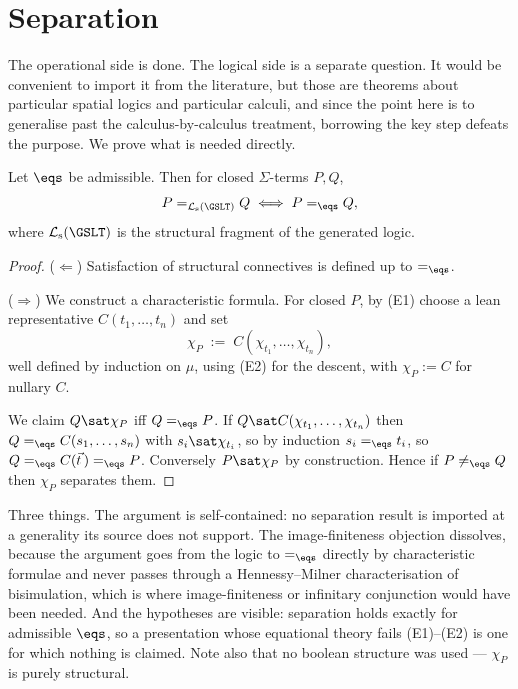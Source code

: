 \section{Separation}
\label{ox:sec:sep}

The operational side is done. The logical side is a separate question. It would be
convenient to import it from the literature, but those are theorems about
particular spatial logics and particular calculi, and since the point here is to
generalise past the calculus-by-calculus treatment, borrowing the key step defeats
the purpose. We prove what is needed directly.

\begin{theorem}
\label{ox:thm:sep}
Let $\eqs$ be admissible. Then for closed $\Sigma$-terms $P,Q$,
\[
  P =_{\mathcal{L}_{\mathrm{s}}(\GSLT)} Q \iff P =_{\eqs} Q ,
\]
where $\mathcal{L}_{\mathrm{s}}(\GSLT)$ is the structural fragment of the
generated logic.
\end{theorem}

\begin{proof}
($\Leftarrow$) Satisfaction of structural connectives is defined up to $=_{\eqs}$.

($\Rightarrow$) We construct a characteristic formula. For closed $P$, by (E1)
choose a lean representative $C(t_1,\dots,t_n)$ and set
\[
  \chi_P \;:=\; C(\chi_{t_1},\dots,\chi_{t_n}),
\]
well defined by induction on $\mu$, using (E2) for the descent, with
$\chi_P := C$ for nullary $C$.

We claim $Q \sat \chi_P$ iff $Q =_{\eqs} P$. If
$Q \sat C(\chi_{t_1},\dots,\chi_{t_n})$ then $Q =_{\eqs} C(s_1,\dots,s_n)$ with
$s_i \sat \chi_{t_i}$, so by induction $s_i =_{\eqs} t_i$, so
$Q =_{\eqs} C(\vec t\,) =_{\eqs} P$. Conversely $P \sat \chi_P$ by construction.
Hence if $P \neq_{\eqs} Q$ then $\chi_P$ separates them.
\end{proof}

\begin{remark}
\label{ox:rem:buys}
Three things. The argument is self-contained: no separation result is imported at
a generality its source does not support. The image-finiteness objection dissolves,
because the argument goes from the logic to $=_{\eqs}$ directly by characteristic
formulae and never passes through a Hennessy--Milner characterisation of
bisimulation, which is where image-finiteness or infinitary conjunction would have
been needed. And the hypotheses are visible: separation holds exactly for
admissible $\eqs$, so a presentation whose equational theory fails (E1)--(E2) is one
for which nothing is claimed. Note also that no boolean structure was used ---
$\chi_P$ is purely structural.
\end{remark}

